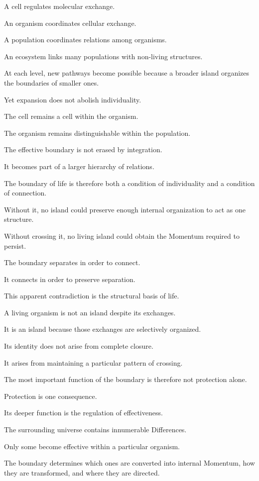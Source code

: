 A cell regulates molecular exchange.

An organism coordinates cellular exchange.

A population coordinates relations among organisms.

An ecosystem links many populations with non-living structures.

At each level, new pathways become possible because a broader island organizes the boundaries of smaller ones.

Yet expansion does not abolish individuality.

The cell remains a cell within the organism.

The organism remains distinguishable within the population.

The effective boundary is not erased by integration.

It becomes part of a larger hierarchy of relations.

The boundary of life is therefore both a condition of individuality and a condition of connection.

Without it, no island could preserve enough internal organization to act as one structure.

Without crossing it, no living island could obtain the Momentum required to persist.

The boundary separates in order to connect.

It connects in order to preserve separation.

This apparent contradiction is the structural basis of life.

A living organism is not an island despite its exchanges.

It is an island because those exchanges are selectively organized.

Its identity does not arise from complete closure.

It arises from maintaining a particular pattern of crossing.

The most important function of the boundary is therefore not protection alone.

Protection is one consequence.

Its deeper function is the regulation of effectiveness.

The surrounding universe contains innumerable Differences.

Only some become effective within a particular organism.

The boundary determines which ones are converted into internal Momentum, how they are transformed, and where they are directed.

